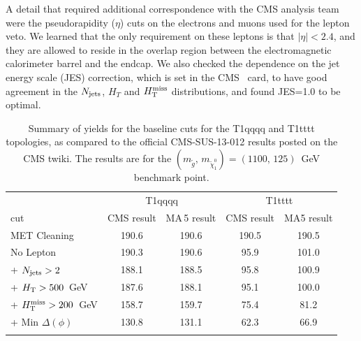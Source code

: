 A detail that required additional correspondence with the CMS analysis team were the pseudorapidity ($\eta$) cuts on the electrons and muons used for the lepton veto. We learned that the only requirement on these leptons is that %
$|\eta|<2.4$, and they are allowed to reside in the overlap region between the electromagnetic calorimeter barrel and the endcap.  
We also checked the dependence on the jet energy scale (JES) correction, which is set in the CMS \delphes\ card, 
to have good agreement in the $N_{\rm jets}$, $H_{T}$ and $H_{\text{T}}^{\rm miss}$ distributions, and found JES=1.0 to be optimal. 

\begin{table}[!t]
\caption{Summary of yields for the baseline cuts for the T1qqqq and T1tttt topologies, as compared to the official CMS-SUS-13-012 results posted on the CMS twiki. The results are for the $(m_{\tilde g},\,m_{\tilde\chi^0_1})=(1100,\,125)$~GeV benchmark point.\label{table:CutFlowT1qqqq}}
\begin{center}
\begin{tabular}{ l ||c|c||c|c}
\hline\noalign{\smallskip}
& \multicolumn{2}{|c||}{T1qqqq} & \multicolumn{2}{c}{T1tttt}  \\
cut & CMS result & {\sc MA}\,5 result & CMS result & {\sc MA}5 result \\ 
\hline\noalign{\smallskip}
MET Cleaning & 190.6 & 190.6 & 190.5  & 190.5    \\ 
No Lepton   & 190.3 & 190.6  &  95.9 & 101.0 \\
+ $N_{\rm jets}>2$        & 188.1 & 188.5  & 95.8 & 100.9  \\
+ $H_{\rm T} > 500$~GeV   & 187.6 & 188.1  & 95.1  &  100.0\\
+ $H_{\text{T}}^{\rm miss} >200$~GeV   &158.7  &  159.7 & 75.4 & 81.2  \\
+ Min $\Delta(\phi)$ & 130.8 & 131.1 &62.3 & 66.9 \\
\noalign{\smallskip}\hline
\end{tabular}
\end{center}
\end{table}

